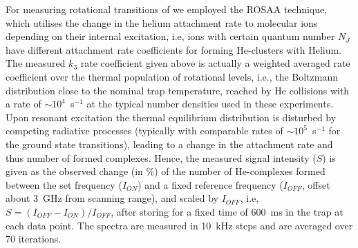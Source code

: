 For measuring rotational transitions of \co we employed the ROSAA technique, which utilises the change in the helium attachment rate to molecular ions depending on their internal excitation, i.e, ions with certain  quantum number $N_J$ have different attachment rate coefficients for forming He-\co clusters with Helium. The measured $k_3$ rate coefficient given above is actually a  weighted averaged rate coefficient over the thermal population of rotational levels, i.e., the Boltzmann distribution close to the nominal trap temperature, reached by He collisions with a rate of $\sim 10^4$~s$^{-1}$ at the typical number densities used in these experiments. Upon resonant excitation the thermal equilibrium distribution is disturbed by competing radiative processes (typically with comparable rates of $\sim 10^5$~s$^{-1}$ for the \co ground state transitions), leading to a change in the attachment rate and thus number of formed complexes. Hence, the measured signal intensity ($S$) is given as the observed change (in \%) of the number of He-\co complexes formed between the set frequency ($I_{ON}$) and a fixed reference frequency ($I_{OFF}$, offset about 3~GHz from scanning range), and scaled by $I_{OFF}$, i.e, $ S=(I_{OFF} - I_{ON})/I_{OFF} $, after storing for a fixed time of 600~ms in the trap at each data point. The spectra are measured in 10~kHz steps and are averaged over 70 iterations. \\


